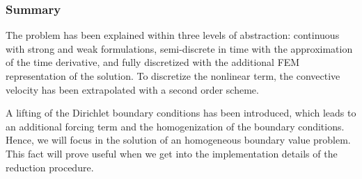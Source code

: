 \documentclass[../../thesis.tex]{subfiles}
\begin{document}
\subsubsection{Summary}
The problem has been explained within three levels of abstraction: 
continuous with strong and weak formulations, 
semi-discrete in time with the approximation of the time derivative, 
and fully discretized with the additional FEM representation of the solution.
To discretize the nonlinear term, 
the convective velocity has been extrapolated with a second order scheme.


A lifting of the Dirichlet boundary conditions has been introduced, 
which leads to an additional forcing term and the homogenization of the boundary conditions.
Hence, we will focus in the solution of an homogeneous boundary value problem.
This fact will prove useful when we get into 
the implementation details of the reduction procedure.
\end{document}

